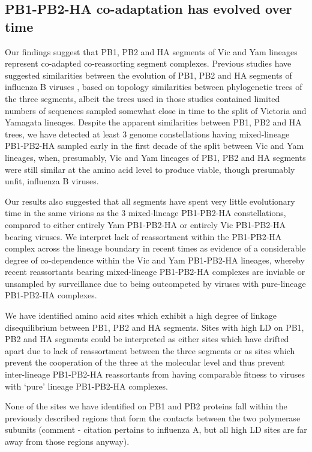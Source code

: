 \documentclass[11pt,oneside,letterpaper]{article}
\begin{document}
\subsection*{PB1-PB2-HA co-adaptation has evolved over time}
Our findings suggest that PB1, PB2 and HA segments of Vic and Yam lineages represent co-adapted co-reassorting segment complexes.
Previous studies have suggested similarities between the evolution of PB1, PB2 and HA segments of influenza B viruses \cite{hiromoto2000,lindstrom1999}, based on topology similarities between phylogenetic trees of the three segments, albeit the trees used in those studies contained limited numbers of sequences sampled somewhat close in time to the split of Victoria and Yamagata lineages.
Despite the apparent similarities between PB1, PB2 and HA trees, we have detected at least 3 genome constellations having mixed-lineage PB1-PB2-HA sampled early in the first decade of the split between Vic and Yam lineages, when, presumably, Vic and Yam lineages of PB1, PB2 and HA segments were still similar at the amino acid level to produce viable, though presumably unfit, influenza B viruses.

Our results also suggested that all segments have spent very little evolutionary time in the same virions as the 3 mixed-lineage PB1-PB2-HA constellations, compared to either entirely Yam PB1-PB2-HA or entirely Vic PB1-PB2-HA bearing viruses.
We interpret lack of reassortment within the PB1-PB2-HA complex across the lineage boundary in recent times as evidence of a considerable degree of co-dependence within the Vic and Yam PB1-PB2-HA lineages, whereby recent reassortants bearing mixed-lineage PB1-PB2-HA complexes are inviable or unsampled by surveillance due to being outcompeted by viruses with pure-lineage PB1-PB2-HA complexes.

We have identified amino acid sites which exhibit a high degree of linkage disequilibrium between PB1, PB2 and HA segments.
Sites with high LD on PB1, PB2 and HA segments could be interpreted as either sites which have drifted apart due to lack of reassortment between the three segments or as sites which prevent the cooperation of the three at the molecular level and thus prevent inter-lineage PB1-PB2-HA reassortants from having comparable fitness to viruses with `pure' lineage PB1-PB2-HA complexes.

None of the sites we have identified on PB1 and PB2 proteins fall within the previously described regions that form the contacts between the two polymerase subunits \cite{sugiyama2009} (comment - citation pertains to influenza A, but all high LD sites are far away from those regions anyway).
\end{document}
